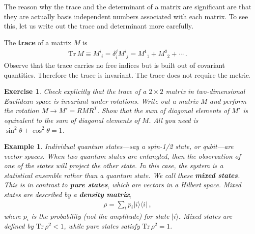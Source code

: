\documentclass[
  11pt,
	colorful,
	raggedright,
]{tufte-style-thesis-flip}
\newtheorem{exercise}{Exercise}[section]
\newtheorem{example}{Example}[section]
\newcommand{\aij}[2]{^{#1}_{\phantom{#1}#2}}
\begin{document}
The reason why the trace and the determinant of a matrix are significant are that they are actually basis independent numbers associated with each matrix. To see this, let us write out the trace and determinant more carefully. 

The \textbf{trace} of a matrix $M$ is
\begin{align}
\text{Tr}\,M \equiv  
  M\aij{i}{i} 
  = \delta^{j}_{i}M\aij{i}{j} 
  = M\aij{1}{1} + M\aij{2}{2}+\cdots \ .
\end{align}
Observe that the trace carries no free indices but is built out of covariant quantities. Therefore the trace is invariant. The trace does not require the metric.

\begin{exercise}
Check explicitly that the trace of a $2\times 2$ matrix in two-dimensional Euclidean space is invariant under rotations. Write out a matrix $M$ and perform the rotation $M\to M' = RM R^T$. Show that the sum of diagonal elements of $M'$ is equivalent to the sum of diagonal elements of $M$. All you need is $\sin^2\theta + \cos^2\theta = 1$.
\end{exercise}

\begin{example}
Individual quantum states---say a spin-1/2 state, or qubit---are vector spaces. When two quantum states are \emph{entangled}, then the observation of one of the states will project the other state. In this case, the system is a statistical ensemble rather than a quantum state. We call these \textbf{mixed states}. This is in contrast to \textbf{pure states}, which are vectors in a Hilbert space. Mixed states are described by a \textbf{density matrix},
\begin{align}
  \rho = \sum_i p_i|i\rangle\langle i| \ ,
\end{align}
where $p_i$ is the \emph{probability} (not the amplitude) for state $|i\rangle$. Mixed states are defined by $\text{Tr}\,\rho^2 <1$, while pure states satisfy $\text{Tr}\,\rho^2 =1$.
\end{example}
\end{document}
